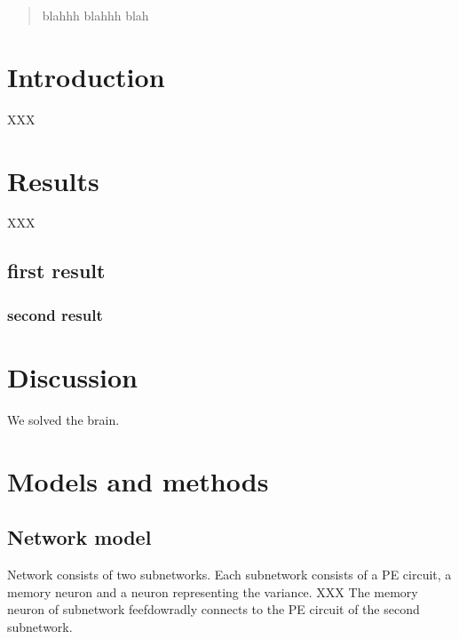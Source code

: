 \documentclass[10pt,a4paper,draft]{article}
\begin{document}
\thispagestyle{empty}

\begin{flushleft}
{\Large
\textbf{}
}

\end{flushleft}


\begin{abstract}
blahhh blahhh blah
\end{abstract}

\section*{Introduction}

XXX


\section*{Results}
%
XXX

\subsection*{first result}
%

\subsubsection*{second result}


\section*{Discussion}

We solved the brain.


\section*{Models and methods}
%

\subsection*{Network model}
%
Network consists of two subnetworks. Each subnetwork consists of a PE circuit, a memory neuron and a neuron representing the variance. XXX The memory neuron of subnetwork feefdowradly connects to the PE circuit of the second subnetwork.
\end{document}

